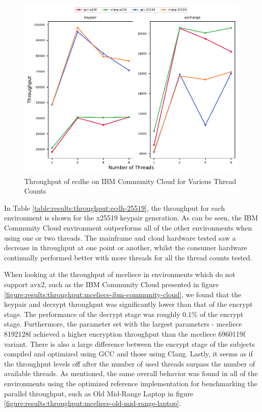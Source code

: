 \begin{figure}
    \centering
    \includegraphics[scale=0.75]{chapters/results/throughput/IBM Community Cloud_ecdh.pdf}
    \caption{Throughput of \gls{ecdhe} on IBM Community Cloud for Various Thread Counts}
    \label{figure:results:throughput:ecdh-ibm-community-cloud}
\end{figure}

In Table \ref{table:results:throughput:ecdh-25519}, the throughput for each environment is shown for the \gls{x25519} keypair generation. As can be seen, the IBM Community Cloud environment outperforms all of the other environments when using one or two threads. The mainframe and cloud hardware tested saw a decrease in throughput at one point or another, whilst the consumer hardware continually performed better with more threads for all the thread counts tested.



When looking at the throughput of \gls{mceliece} in environments which do not support \gls{avx2}, such as the IBM Community Cloud presented in figure \ref{figure:results:throughput:mceliece-ibm-community-cloud}, we found that the keypair and decrypt throughput was significantly lower than that of the encrypt stage. The performance of the decrypt stage was roughly $0.1\%$ of the encrypt stage. Furthermore, the parameter set with the largest parameters - \gls{mceliece} 8192128f achieved a higher encryption throughput than the \gls{mceliece} 6960119f variant. There is also a large difference between the encrypt stage of the subjects compiled and optimized using GCC and those using Clang. Lastly, it seems as if the throughput levels off after the number of used threads surpass the number of available threads. As mentioned, the same overall behavior was found in all of the environments using the optimized reference implementation for benchmarking the parallel throughput, such as Old Mid-Range Laptop in figure \ref{figure:results:throughput:mceliece-old-mid-range-laptop}.

